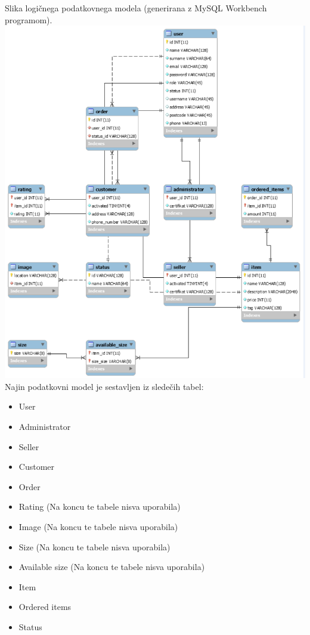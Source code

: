 \documentclass[a4paper,12pt]{report}
\begin{document}
Slika logičnega podatkovnega modela (generirana z MySQL Workbench programom).
\newline
\includegraphics[scale=0.9]{images/database_model_diagram.png}
\newpage
Najin podatkovni model je sestavljen iz sledečih tabel:
\begin{itemize}
    \item User
    \item Administrator
    \item Seller
    \item Customer
    \item Order
    \item Rating (Na koncu te tabele nisva uporabila)
    \item Image (Na koncu te tabele nisva uporabila)
    \item Size (Na koncu te tabele nisva uporabila)
    \item Available size (Na koncu te tabele nisva uporabila)
    \item Item
    \item Ordered items
    \item Status
\end{itemize}
\end{document}
